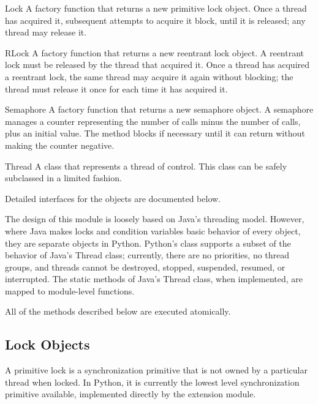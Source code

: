 \begin{funcdesc}{Lock}{}
A factory function that returns a new primitive lock object.  Once
a thread has acquired it, subsequent attempts to acquire it block,
until it is released; any thread may release it.
\end{funcdesc}

\begin{funcdesc}{RLock}{}
A factory function that returns a new reentrant lock object.
A reentrant lock must be released by the thread that acquired it.
Once a thread has acquired a reentrant lock, the same thread may
acquire it again without blocking; the thread must release it once
for each time it has acquired it.
\end{funcdesc}

\begin{funcdesc}{Semaphore}{}
A factory function that returns a new semaphore object.  A
semaphore manages a counter representing the number of 
calls minus the number of  calls, plus an initial value.
The  method blocks if necessary until it can return
without making the counter negative.
\end{funcdesc}

\begin{classdesc}{Thread}{}
A class that represents a thread of control.  This class can be safely subclassed in a limited fashion.
\end{classdesc}

Detailed interfaces for the objects are documented below.  

The design of this module is loosely based on Java's threading model.
However, where Java makes locks and condition variables basic behavior
of every object, they are separate objects in Python.  Python's 
class supports a subset of the behavior of Java's Thread class;
currently, there are no priorities, no thread groups, and threads
cannot be destroyed, stopped, suspended, resumed, or interrupted.  The
static methods of Java's Thread class, when implemented, are mapped to
module-level functions.

All of the methods described below are executed atomically.


\subsection{Lock Objects \label{lock-objects}}

A primitive lock is a synchronization primitive that is not owned
by a particular thread when locked.  In Python, it is currently
the lowest level synchronization primitive available, implemented
directly by the  extension module.

